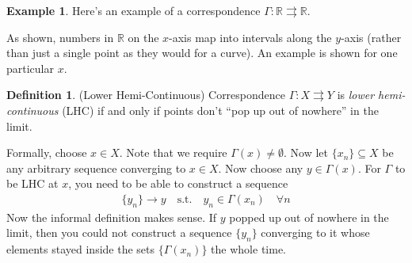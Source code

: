 \documentclass[12pt]{book}
\numberwithin{equation}{section} %
\theoremstyle{plain}
\theoremstyle{definition}
\newtheorem{defn}[thm]{Definition}
\newtheorem{ex}[thm]{Example}
\theoremstyle{remark}
\newcommand{\R}{\mathbb{R}}
\begin{document}
\begin{ex}
Here's an example of a correspondence $\Gamma: \R\rightrightarrows\R$.
\begin{figure}[htpb!]
\centering
{}
\end{figure}

As shown, numbers in $\R$ on the $x$-axis map into intervals along the
$y$-axis (rather than just a single point as they would for a curve).
An example is shown for one particular $x$.
\end{ex}

\begin{defn}{(Lower Hemi-Continuous)}
Correspondence $\Gamma:X\rightrightarrows Y$ is \emph{lower
hemi-continuous} (LHC) if and only if points don't ``pop up out of
nowhere'' in the limit.

Formally, choose $x\in X$. Note that we require
$\Gamma(x)\neq\emptyset$. Now let $\{x_n\}\subseteq X$ be any arbitrary
sequence converging to $x\in X$. Now choose any $y\in\Gamma(x)$.  For
$\Gamma$ to be LHC at $x$, you need to be able to construct a sequence
\begin{align*}
  \{y_n\}\rightarrow y
  \quad\text{s.t.}\quad
  y_n \in \Gamma(x_n) \quad\forall n
\end{align*}
Now the informal definition makes sense. If $y$ popped up out of
nowhere in the limit, then you could not construct a sequence $\{y_n\}$
converging to it whose elements stayed inside the sets
$\{\Gamma({x_n})\}$ the whole time.
\end{defn}
\end{document}
